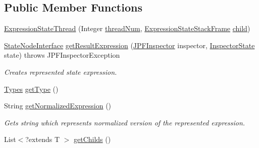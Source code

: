 \subsection*{Public Member Functions}
\begin{DoxyCompactItemize}
\item 
\hyperlink{classgov_1_1nasa_1_1jpf_1_1inspector_1_1server_1_1expression_1_1expressions_1_1_expression_state_thread_a4febd8d11241ce53fde012f0caf0e75e}{Expression\+State\+Thread} (Integer \hyperlink{classgov_1_1nasa_1_1jpf_1_1inspector_1_1server_1_1expression_1_1expressions_1_1_expression_state_thread_a4db41aca6ee66ae2da3753785bed3167}{thread\+Num}, \hyperlink{classgov_1_1nasa_1_1jpf_1_1inspector_1_1server_1_1expression_1_1expressions_1_1_expression_state_stack_frame}{Expression\+State\+Stack\+Frame} \hyperlink{classgov_1_1nasa_1_1jpf_1_1inspector_1_1server_1_1expression_1_1_expression_state_unary_operator_a66041b1f569a361549e28a00f7ca5f2f}{child})
\item 
\hyperlink{interfacegov_1_1nasa_1_1jpf_1_1inspector_1_1server_1_1programstate_1_1_state_node_interface}{State\+Node\+Interface} \hyperlink{classgov_1_1nasa_1_1jpf_1_1inspector_1_1server_1_1expression_1_1expressions_1_1_expression_state_thread_a0ea05a0e2f04a90ec1671190dff3fc24}{get\+Result\+Expression} (\hyperlink{classgov_1_1nasa_1_1jpf_1_1inspector_1_1server_1_1jpf_1_1_j_p_f_inspector}{J\+P\+F\+Inspector} inspector, \hyperlink{interfacegov_1_1nasa_1_1jpf_1_1inspector_1_1server_1_1expression_1_1_inspector_state}{Inspector\+State} state)  throws J\+P\+F\+Inspector\+Exception 
\begin{DoxyCompactList}\small\item\em Creates represented state expression. \end{DoxyCompactList}\item 
\hyperlink{enumgov_1_1nasa_1_1jpf_1_1inspector_1_1server_1_1expression_1_1_types}{Types} \hyperlink{classgov_1_1nasa_1_1jpf_1_1inspector_1_1server_1_1expression_1_1expressions_1_1_expression_state_thread_a9223fb79a121a903aaab99c20fa46cbd}{get\+Type} ()
\item 
String \hyperlink{classgov_1_1nasa_1_1jpf_1_1inspector_1_1server_1_1expression_1_1expressions_1_1_expression_state_thread_a8e2420c4821522c88896def518d32f4a}{get\+Normalized\+Expression} ()
\begin{DoxyCompactList}\small\item\em Gets string which represents normalized version of the represented expression. \end{DoxyCompactList}\item 
List$<$?extends T $>$ \hyperlink{classgov_1_1nasa_1_1jpf_1_1inspector_1_1server_1_1expression_1_1_expression_state_unary_operator_ad010bcb9c4e2eb584321b5ceba8e1682}{get\+Childs} ()
\end{DoxyCompactItemize}
